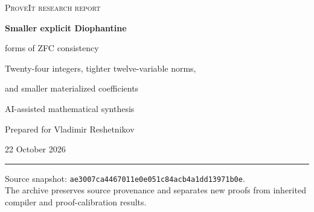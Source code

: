 \documentclass[11pt,letterpaper]{article}
\theoremstyle{remark}
\begin{document}
\hypersetup{pageanchor=false}
\begin{titlepage}
\vspace*{0.55in}
{\color{inkblue}\Large\textsc{ProveIt research report}\par}
\vspace{0.35in}
{\huge\bfseries Smaller explicit Diophantine\par
 forms of ZFC consistency\par}
\vspace{0.3in}
{\Large Twenty-four integers, tighter twelve-variable norms,\par
 and smaller materialized coefficients\par}
\vspace{0.35in}
{\large AI-assisted mathematical synthesis\par}
{\large Prepared for Vladimir Reshetnikov\par}
\vspace{0.15in}
{22 October 2026\par}
\vspace{0.4in}
\noindent\rule{\textwidth}{0.6pt}
\begin{abstract}
\noindent
Combining rational Pell saturation, separating-root norms, signed-domain
arguments and a concrete padding controller gives an explicit polynomial
in 24 unrestricted integers of degree 1936 with a 167-operation circuit.
ZFC proves that its lack of integer solutions is equivalent to
$\operatorname{Con}(\mathrm{ZFC})$.  Its three-equation version has degree
1920 and uses 162 operations.  Three twelve-positive-variable alternatives
have degree/operation pairs $(1069,123)$, $(1073,121)$ and $(1081,120)$.
An exact refactoring reduces the existing degree-1353 twelve-variable
equation to 113 operations.  Retaining the 943-tile language while
replacing five-power rounding reduces the fixed base to
$B=2^{6364399}$; all four resulting integers are materialized.
The report supplies explicit polynomial definitions, ordinary
mathematical proofs, arithmetic circuits and reproducible finite audits.
It does not claim a global minimum or a new kernel-checked end-to-end
formalization.
\end{abstract}
\vfill
\noindent\small
Source snapshot: \texttt{ae3007ca4467011e0e051c84acb4a1dd13971b0e}.\\
The archive preserves source provenance and separates new proofs from
inherited compiler and proof-calibration results.
\end{titlepage}

\hypersetup{pageanchor=true}
\tableofcontents
\clearpage
{}
\end{document}
